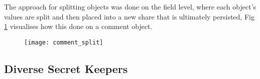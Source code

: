 The approach for splitting objects was done on the field level, where each object's values are split and then placed into a new share that is ultimately persisted, Fig \ref{fig:comment_split} visualises how this done on a comment object. 

\begin{figure}[ht]
    \centering
    \texttt{[image: comment\_split]}
    \caption{}
    \label{fig:comment_split}
\end{figure}

\subsection{Diverse Secret Keepers}\label{SS:diverse_secret_keepers}



















